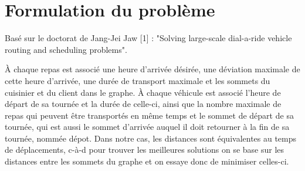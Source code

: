 \documentclass[10pt,a4paper]{report}
\begin{document}

\section*{Formulation du problème}
Basé sur le doctorat de Jang-Jei Jaw [1] : "Solving large-scale dial-a-ride vehicle routing and scheduling problems". \newline

À chaque repas est associé une heure d'arrivée désirée, une déviation maximale de cette heure d'arrivée, une durée de transport maximale et les sommets du cuisinier et du client dans le graphe. À chaque véhicule est associé l'heure de départ de sa tournée et la durée de celle-ci, ainsi que la nombre maximale de repas qui peuvent être transportés en même temps et le sommet de départ de sa tournée, qui est aussi le sommet d'arrivée auquel il doit retourner à la fin de sa tournée, nommée dépot. Dans notre cas, les distances sont équivalentes au temps de déplacements, c-à-d pour trouver les meilleures solutions on se base sur les distances entre les sommets du graphe et on essaye donc de minimiser celles-ci.

    
\end{document}
